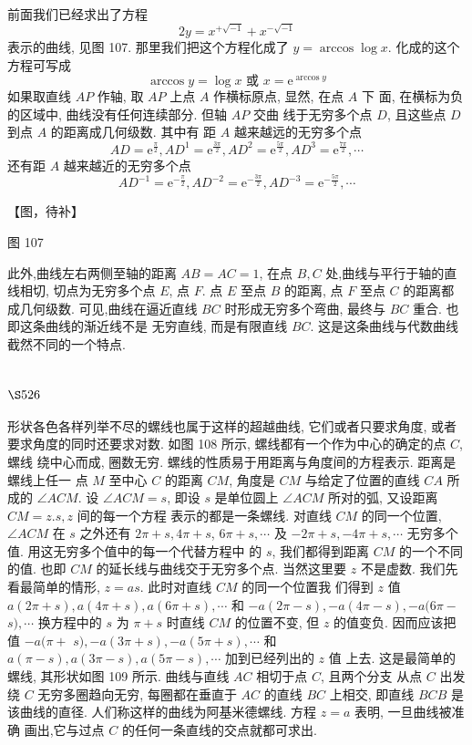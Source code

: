 前面我们已经求出了方程
\[
2 y=x^{+\sqrt{-1}}+x^{-\sqrt{-1}}
\]
表示的曲线, 见图 107. 那里我们把这个方程化成了 $y=\arccos \log x$. 化成的这个方程可写成
\[
\arccos y=\log x \text { 或 } x=\mathrm{e}^{\arccos y}
\]
如果取直线 $A P$ 作轴, 取 $A P$ 上点 $A$ 作横标原点, 显然, 在点 $A$ 下 面, 在横标为负的区域中, 曲线没有任何连续部分. 但轴 $A P$ 交曲 线于无穷多个点 $D$, 且这些点 $D$ 到点 $A$ 的距离成几何级数. 其中有 距 $A$ 越来越远的无穷多个点
\[
A D=\mathrm{e}^{\frac{\pi}{2}}, A D^{1}=\mathrm{e}^{\frac{3 \pi}{2}}, A D^{2}=\mathrm{e}^{\frac{5 \pi}{2}}, A D^{3}=\mathrm{e}^{\frac{7 \pi}{2}}, \cdots
\]
还有距 $A$ 越来越近的无穷多个点
\[
A D^{-1}=\mathrm{e}^{-\frac{\pi}{2}}, A D^{-2}=\mathrm{e}^{-\frac{3 \pi}{2}}, A D^{-3}=\mathrm{e}^{-\frac{5 \pi}{2}}, \cdots
\]

【图，待补】

图 107

此外,曲线左右两侧至轴的距离 $A B=A C=1$, 在点 $B, C$ 处,曲线与平行于轴的直线相切, 切点为无穷多个点 $E$, 点 $F$. 点 $E$ 至点 $B$ 的距离, 点 $F$ 至点 $C$ 的距离都成几何级数. 可见,曲线在逼近直线 $B C$ 时形成无穷多个弯曲, 最终与 $B C$ 重合. 也即这条曲线的渐近线不是 无穷直线, 而是有限直线 $B C$. 这是这条曲线与代数曲线截然不同的一个特点.

\section{$\S 526$}

形状各色各样列举不尽的螺线也属于这样的超越曲线, 它们或者只要求角度, 或者 要求角度的同时还要求对数. 如图 108 所示, 螺线都有一个作为中心的确定的点 $C$, 螺线 绕中心而成, 圈数无穷. 螺线的性质易于用距离与角度间的方程表示. 距离是螺线上任一 点 $M$ 至中心 $C$ 的距离 $C M$, 角度是 $C M$ 与给定了位置的直线 $C A$ 所成的 $\angle A C M$. 设 $\angle A C M=s$, 即设 $s$ 是单位圆上 $\angle A C M$ 所对的弧, 又设距离 $C M=z . s, z$ 间的每一个方程 表示的都是一条螺线. 对直线 $C M$ 的同一个位置, $\angle A C M$ 在 $s$ 之外还有 $2 \pi+s, 4 \pi+s$, $6 \pi+s, \cdots$ 及 $-2 \pi+s,-4 \pi+s, \cdots$ 无穷多个值. 用这无穷多个值中的每一个代替方程中 的 $s$, 我们都得到距离 $C M$ 的一个不同的值. 也即 $C M$ 的延长线与曲线交于无穷多个点. 当然这里要 $z$ 不是虚数. 我们先看最简单的情形, $z=a s$. 此时对直线 $C M$ 的同一个位置我 们得到 $z$ 值 $a(2 \pi+s), a(4 \pi+s), a(6 \pi+s), \cdots$ 和 $-a(2 \pi-s),-a(4 \pi-s),-a(6 \pi-$ $s), \cdots$ 换方程中的 $s$ 为 $\pi+s$ 时直线 $C M$ 的位置不变, 但 $z$ 的值变负. 因而应该把值 $-a(\pi+$ $s),-a(3 \pi+s),-a(5 \pi+s), \cdots$ 和 $a(\pi-s), a(3 \pi-s), a(5 \pi-s), \cdots$ 加到已经列出的 $z$ 值 上去. 这是最简单的螺线, 其形状如图 109 所示. 曲线与直线 $A C$ 相切于点 $C$, 且两个分支 从点 $C$ 出发绕 $C$ 无穷多圈趋向无穷, 每圈都在垂直于 $A C$ 的直线 $B C$ 上相交, 即直线 $B C B$ 是该曲线的直径. 人们称这样的曲线为阿基米德螺线. 方程 $z=a$ 表明, 一旦曲线被准确 画出,它与过点 $C$ 的任何一条直线的交点就都可求出.


